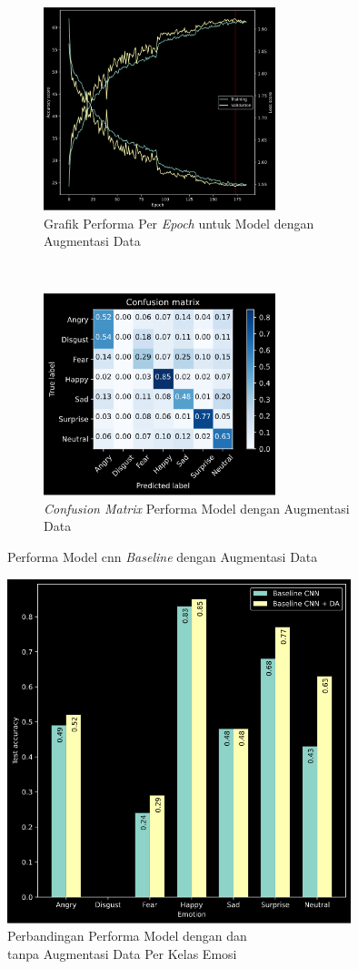 \begin{figure}[!htb]
    \centering
    \begin{subfigure}[t]{6.75cm}
        \includegraphics[width=6.75cm]{gambar/eksperimen2_grafik1.png}
        \caption{Grafik Performa Per \textit{Epoch} untuk Model dengan Augmentasi Data}
        \label{fig:grafikeksperimen2}
    \end{subfigure}
    ~~~
    \begin{subfigure}[t]{6.75cm}
        \includegraphics[width=6.75cm]{gambar/eksperimen2_matriks1.png}
        \caption{\textit{Confusion Matrix} Performa Model dengan Augmentasi Data}
        \label{fig:confusionmatrixeksperimen2}
    \end{subfigure}
    \caption{Performa Model \acrshort{cnn} \textit{Baseline} dengan Augmentasi Data}
    \label{fig:hasileksperimen2}
\end{figure}
\begin{figure}[t]
    \centering
    \includegraphics[width=10cm]{gambar/eksperimen1vs2_grafik1.png}
    \caption{Perbandingan Performa Model dengan dan\\tanpa Augmentasi Data Per Kelas Emosi}
    \label{fig:perbandinganeksperimen1dan2}
\end{figure}
